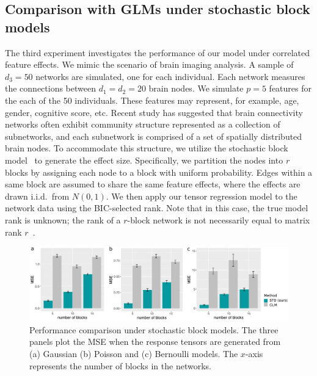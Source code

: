 \documentclass[12pt]{article}
\theoremstyle{definition}
\theoremstyle{definition}
\begin{document}
\subsection{Comparison with GLMs under stochastic block models}
The third experiment investigates the performance of our model under correlated feature effects. We mimic the scenario of brain imaging analysis. A sample of $d_3=50$ networks are simulated, one for each individual. Each network measures the connections between $d_1=d_2=20$ brain nodes. We simulate $p=5$ features for the each of the 50 individuals. These features may represent, for example, age, gender, cognitive score, etc. Recent study has suggested that brain connectivity networks often exhibit community structure represented as a collection of subnetworks, and each subnetwork is comprised of a set of spatially distributed brain nodes. To accommodate this structure, we utilize the stochastic block model~\citep{abbe2017community} to generate the effect size. Specifically, we partition the nodes into $r$ blocks by assigning each node to a block with uniform probability. Edges within a same block are assumed to share the same feature effects, where the effects are drawn i.i.d.\ from $N(0,1)$. We then apply our tensor regression model to the network data using the BIC-selected rank. Note that in this case, the true model rank is unknown; the rank of a $r$-block network is not necessarily equal to matrix rank $r$~\citep{zeng2019multiway}. 

\begin{figure}[ht]
\centering
\includegraphics[width=16cm]{compare_GLM.pdf}
\caption{Performance comparison under stochastic block models. The three panels plot the MSE when the response tensors are generated from (a) Gaussian (b) Poisson and (c) Bernoulli models. The $x$-axis represents the number of blocks in the networks. }\label{fig:glm}
\vspace{-.2cm}
\end{figure}
\end{document}
